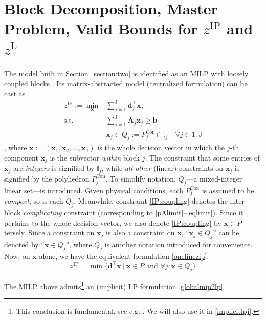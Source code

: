 \documentclass[journal]{IEEEtran}
\begin{document}
\section{Block Decomposition, Master Problem, Valid Bounds for $z^\mathrm{IP}$ and $z^\mathrm{L}$}\label{section:three}
The model built in Section~\ref{section:two} is identified as an
MILP with loosely coupled blocks \cite{chenrui2024}.
Its matrix-abstracted model (centralized formulation) can be cast as
\begin{align}
   z^\mathrm{IP} := \min_\mathbf{x} & \sum_{j=1}^\mathrm{J} \mathbf{d}_j^\top \mathbf{x}_j \label{IP:begin} \\
    \text{s.t. }& \sum_{j=1}^\mathrm{J} \mathbf{A}_j \mathbf{x}_j \geqslant \mathbf{b} \quad  \label{IP:coupling} \\
     & \mathbf{x}_j \in Q_j := P^\mathrm{Con}_j \cap \mathbb{I}_j \quad \forall j \in 1\!:\!\mathrm{J} \label{IP:end}
\end{align}
, where $\mathbf{x} := (\mathbf{x}_1, \mathbf{x}_2, ..., \mathbf{x}_\mathrm{J})$ is the whole
decision vector in which the $j$-th component $\mathbf{x}_j$ is the subvector \textit{within} block $j$.
The constraint that some entries of $\mathbf{x}_j$ are \textit{integers} is signified by $\mathbb{I}_j$,
while \textit{all other} (linear) constraints on $\mathbf{x}_j$ is signified by the polyhedron $P^\mathrm{Con}_j$.
To simplify notation, $Q_j$---a mixed-integer linear set---is introduced.
Given physical conditions, each $P^\mathrm{Con}_j$ is assumed to be \textit{compact},
so is each $Q_j$.
Meanwhile, constraint \eqref{IP:coupling} denotes the inter-block \textit{complicating} 
constraint (corresponding to \eqref{pAlimit}--\eqref{eqlimit}).
Since it pertains to the whole decision vector, we also denote \eqref{IP:coupling} by
$\mathbf{x} \in P$ tersely.
Since a constraint on $\mathbf{x}_j$ is also a constraint on $\mathbf{x}$,
``$\mathbf{x}_j \in Q_j$'' can be denoted by ``$\mathbf{x} \in \bar{Q}_j$'', where $\bar{Q}_j$
is another notation introduced for convenience.
Now, on $\mathbf{x}$ alone, we have the equivalent formulation \eqref{onelinezip}.
\begin{equation}\label{onelinezip}
    z^\mathrm{IP} = \min \{ \mathbf{d}^\top \mathbf{x} \ | \ \mathbf{x} \in P \text{ and } \forall j : \mathbf{x} \in \bar{Q}_j \}
\end{equation}
\par
The MILP above admits\footnote{This conclusion is fundamental, see e.g. \cite{ip2014}. We will also use it in \eqref{implicitlpj}.} an (implicit) LP formulation \eqref{globalmip2lp}.
\end{document}
